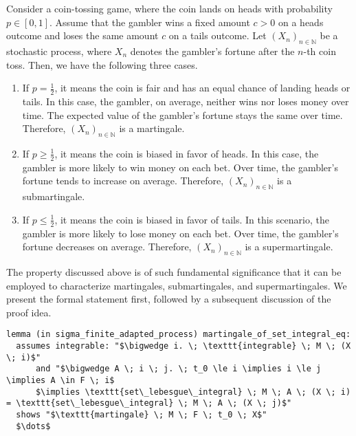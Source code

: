 \begin{example}
Consider a coin-tossing game, where the coin lands on heads with probability $p \in [0,1]$. Assume that the gambler wins a fixed amount $c > 0$ on a heads outcome and loses the same amount $c$ on a tails outcome. Let $(X_n)_{n \in \mathbb{N}}$ be a stochastic process, where $X_n$ denotes the gambler's fortune after the $n$-th coin toss. Then, we have the following three cases.
\begin{enumerate}
\item If $p = \frac{1}{2}$, it means the coin is fair and has an equal chance of landing heads or tails. In this case, the gambler, on average, neither wins nor loses money over time. The expected value of the gambler's fortune stays the same over time. Therefore, $(X_n)_{n \in \mathbb{N}}$ is a martingale. \\
\item If $p \ge \frac{1}{2}$, it means the coin is biased in favor of heads. In this case, the gambler is more likely to win money on each bet. Over time, the gambler's fortune tends to increase on average. Therefore, $(X_n)_{n \in \mathbb{N}}$ is a submartingale.
\item If $p \le \frac{1}{2}$, it means the coin is biased in favor of tails. In this scenario, the gambler is more likely to lose money on each bet. Over time, the gambler's fortune decreases on average. Therefore, $(X_n)_{n \in \mathbb{N}}$ is a supermartingale.\\
\end{enumerate}
\end{example}

The property discussed above is of such fundamental significance that it can be employed to characterize martingales, submartingales, and supermartingales. We present the formal statement first, followed by a subsequent discussion of the proof idea.

\begin{isalemma}
{\small
\begin{lstlisting}[style=isabelle]
lemma (in sigma_finite_adapted_process) martingale_of_set_integral_eq:
  assumes integrable: "$\bigwedge i. \; \texttt{integrable} \; M \; (X \; i)$"
      and "$\bigwedge A \; i \; j. \; t_0 \le i \implies i \le j \implies A \in F \; i$
	  $\implies \texttt{set\_lebesgue\_integral} \; M \; A \; (X \; i) = \texttt{set\_lebesgue\_integral} \; M \; A \; (X \; j)$" 
  shows "$\texttt{martingale} \; M \; F \; t_0 \; X$"
  $\dots$
\end{lstlisting}
}
\end{isalemma}

